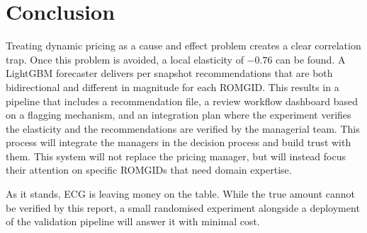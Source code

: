 \documentclass[11pt,a4paper]{article}
\begin{document}
\section{Conclusion}

Treating dynamic pricing as a cause and effect problem creates a clear correlation trap. Once this problem is avoided, a local elasticity of $-0.76$ can be found. A LightGBM forecaster delivers per snapshot recommendations that are both bidirectional and different in magnitude for each ROMGID. This results in a pipeline that includes a recommendation file, a review workflow dashboard based on a flagging mechanism, and an integration plan where the experiment verifies the elasticity and the recommendations are verified by the managerial team. This process will integrate the managers in the decision process and build trust with them. This system will not replace the pricing manager, but will instead focus their attention on specific ROMGIDs that need domain expertise.

As it stands, ECG is leaving money on the table. While the true amount cannot be verified by this report, a small randomised experiment alongside a deployment of the validation pipeline will answer it with minimal cost.
\end{document}

